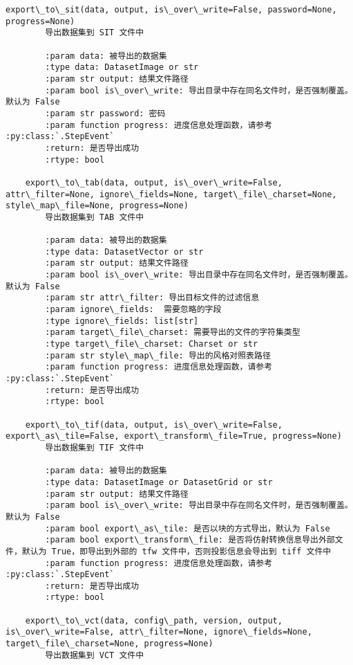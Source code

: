 \documentclass[11pt]{article}
\begin{document}
\begin{Verbatim}[commandchars=\\\{\}]
    export\_to\_sit(data, output, is\_over\_write=False, password=None, progress=None)
        导出数据集到 SIT 文件中
        
        :param data: 被导出的数据集
        :type data: DatasetImage or str
        :param str output: 结果文件路径
        :param bool is\_over\_write: 导出目录中存在同名文件时，是否强制覆盖。默认为 False
        :param str password: 密码
        :param function progress: 进度信息处理函数，请参考 :py:class:`.StepEvent`
        :return: 是否导出成功
        :rtype: bool
    
    export\_to\_tab(data, output, is\_over\_write=False, attr\_filter=None, ignore\_fields=None, target\_file\_charset=None, style\_map\_file=None, progress=None)
        导出数据集到 TAB 文件中
        
        :param data: 被导出的数据集
        :type data: DatasetVector or str
        :param str output: 结果文件路径
        :param bool is\_over\_write: 导出目录中存在同名文件时，是否强制覆盖。默认为 False
        :param str attr\_filter: 导出目标文件的过滤信息
        :param ignore\_fields:  需要忽略的字段
        :type ignore\_fields: list[str]
        :param target\_file\_charset: 需要导出的文件的字符集类型
        :type target\_file\_charset: Charset or str
        :param str style\_map\_file: 导出的风格对照表路径
        :param function progress: 进度信息处理函数，请参考 :py:class:`.StepEvent`
        :return: 是否导出成功
        :rtype: bool
    
    export\_to\_tif(data, output, is\_over\_write=False, export\_as\_tile=False, export\_transform\_file=True, progress=None)
        导出数据集到 TIF 文件中
        
        :param data: 被导出的数据集
        :type data: DatasetImage or DatasetGrid or str
        :param str output: 结果文件路径
        :param bool is\_over\_write: 导出目录中存在同名文件时，是否强制覆盖。默认为 False
        :param bool export\_as\_tile: 是否以块的方式导出，默认为 False
        :param bool export\_transform\_file: 是否将仿射转换信息导出外部文件，默认为 True，即导出到外部的 tfw 文件中，否则投影信息会导出到 tiff 文件中
        :param function progress: 进度信息处理函数，请参考 :py:class:`.StepEvent`
        :return: 是否导出成功
        :rtype: bool
    
    export\_to\_vct(data, config\_path, version, output, is\_over\_write=False, attr\_filter=None, ignore\_fields=None, target\_file\_charset=None, progress=None)
        导出数据集到 VCT 文件中
        

\end{Verbatim}
\end{document}
